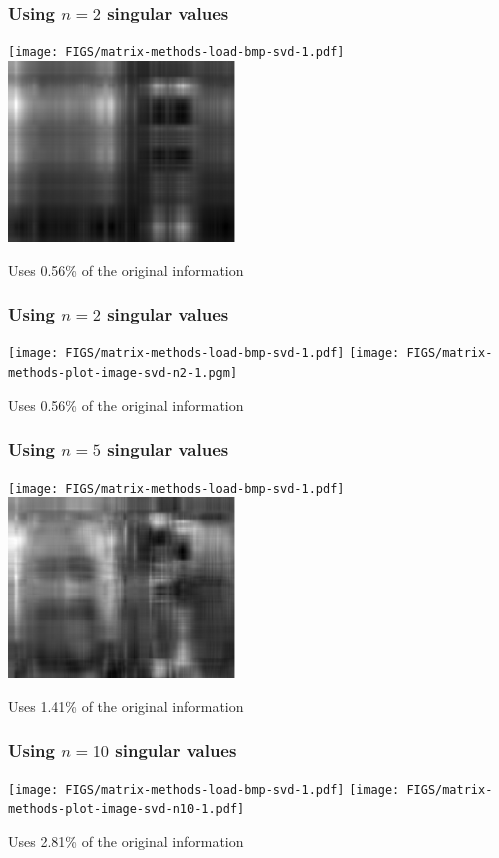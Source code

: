 \documentclass[aspectratio=169]{beamer}\usepackage[]{graphicx}\usepackage[]{xcolor}
\begin{document}
\begin{frame}\frametitle{Using $n=2$ singular values}
\begin{center}
\texttt{[image: FIGS/matrix-methods-load-bmp-svd-1.pdf]}
\includegraphics[width=0.45\textwidth]{FIGS/matrix-methods-plot-image-svd-n2-1.pdf}
\end{center}
\vfill
Uses 0.56\% of the original information
\end{frame}


\begin{frame}\frametitle{Using $n=2$ singular values}
\begin{center}
\texttt{[image: FIGS/matrix-methods-load-bmp-svd-1.pdf]}
\texttt{[image: FIGS/matrix-methods-plot-image-svd-n2-1.pgm]}
\end{center}
\vfill
Uses 0.56\% of the original information
\end{frame}



\begin{frame}\frametitle{Using $n=5$ singular values}
\begin{center}
\texttt{[image: FIGS/matrix-methods-load-bmp-svd-1.pdf]}
\includegraphics[width=0.45\textwidth]{FIGS/matrix-methods-plot-image-svd-n5-1.pdf}
\end{center}
\vfill
Uses 1.41\% of the original information
\end{frame}




\begin{frame}\frametitle{Using $n=10$ singular values}
\begin{center}
\texttt{[image: FIGS/matrix-methods-load-bmp-svd-1.pdf]}
\texttt{[image: FIGS/matrix-methods-plot-image-svd-n10-1.pdf]}
\end{center}
\vfill
Uses 2.81\% of the original information
\end{frame}
\end{document}

